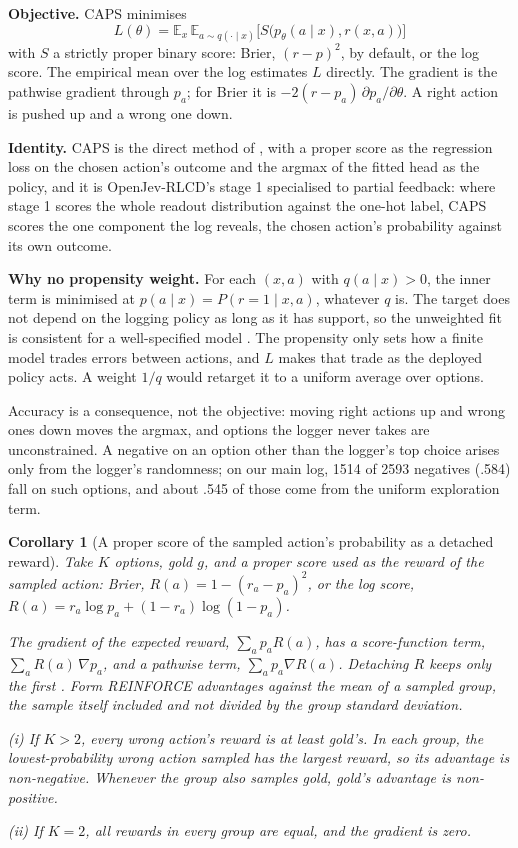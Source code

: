 \documentclass[10pt,letterpaper]{article}
\theoremstyle{plain}
\newtheorem{corollary}{Corollary}
\begin{document}
\textbf{Objective.} CAPS minimises
\begin{equation}
  \label{eq:caps}
  L(\theta) = \mathbb{E}_x\, \mathbb{E}_{a \sim q(\cdot \mid x)} \bigl[ S\bigl(p_\theta(a \mid x), r(x, a)\bigr) \bigr]
\end{equation}
with $S$ a strictly proper binary score: Brier, $(r - p)^2$, by default, or the log score. The empirical mean over the log estimates $L$ directly. The gradient is the pathwise gradient through $p_a$; for Brier it is $-2 (r - p_a)\, \partial p_a / \partial \theta$. A right action is pushed up and a wrong one down.

\textbf{Identity.} CAPS is the direct method of \citet{dudik2011doubly}, with a proper score as the regression loss on the chosen action's outcome and the argmax of the fitted head as the policy, and it is OpenJev-RLCD's stage 1 specialised to partial feedback: where stage 1 scores the whole readout distribution against the one-hot label, CAPS scores the one component the log reveals, the chosen action's probability against its own outcome.

\textbf{Why no propensity weight.} For each $(x, a)$ with $q(a \mid x) > 0$, the inner term is minimised at $p(a \mid x) = P(r = 1 \mid x, a)$, whatever $q$ is. The target does not depend on the logging policy as long as it has support, so the unweighted fit is consistent for a well-specified model \citep{shimodaira2000covariate}. The propensity only sets how a finite model trades errors between actions, and $L$ makes that trade as the deployed policy acts. A weight $1/q$ would retarget it to a uniform average over options.

Accuracy is a consequence, not the objective: moving right actions up and wrong ones down moves the argmax, and options the logger never takes are unconstrained. A negative on an option other than the logger's top choice arises only from the logger's randomness; on our main log, 1514 of 2593 negatives (.584) fall on such options, and about .545 of those come from the uniform exploration term.

\begin{corollary}[A proper score of the sampled action's probability as a detached reward]\label{cor:detached}
Take $K$ options, gold $g$, and a proper score used as the reward of the sampled action: Brier, $R(a) = 1 - (r_a - p_a)^2$, or the log score, $R(a) = r_a \log p_a + (1 - r_a) \log(1 - p_a)$.

The gradient of the expected reward, $\sum_a p_a R(a)$, has a score-function term, $\sum_a R(a)\, \nabla p_a$, and a pathwise term, $\sum_a p_a \nabla R(a)$. Detaching $R$ keeps only the first \citep{schulman2015scg}. Form REINFORCE advantages against the mean of a sampled group, the sample itself included and not divided by the group standard deviation.

(i) If $K > 2$, every wrong action's reward is at least gold's. In each group, the lowest-probability wrong action sampled has the largest reward, so its advantage is non-negative. Whenever the group also samples gold, gold's advantage is non-positive.

(ii) If $K = 2$, all rewards in every group are equal, and the gradient is zero.
\end{corollary}
\end{document}
